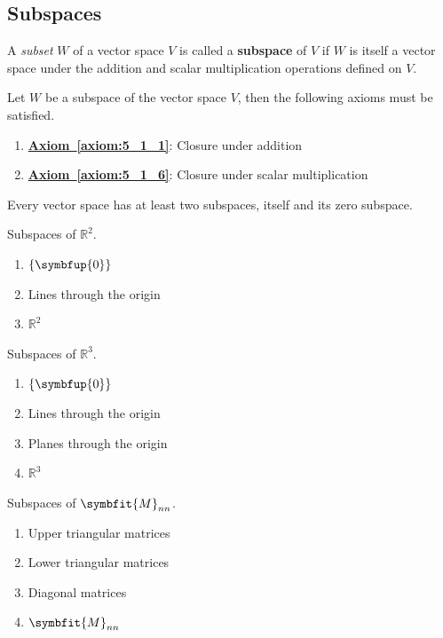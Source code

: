 \documentclass{article}
\begin{document}
\subsection{Subspaces}
\begin{definition}
    A \textit{subset} \(W\) of a vector space \(V\) is called a
    \textbf{subspace} of \(V\) if \(W\) is itself a vector space under
    the addition and scalar multiplication operations defined on \(V\).
\end{definition}
\begin{theorem}
    Let \(W\) be a subspace of the vector space \(V\), then the
    following axioms must be satisfied.
    \begin{enumerate}
        \item \textbf{\hyperref[axiom:5_1_1]{Axiom~\ref{axiom:5_1_1}}}:
              Closure under addition
        \item \textbf{\hyperref[axiom:5_1_6]{Axiom~\ref{axiom:5_1_6}}}:
              Closure under scalar multiplication
    \end{enumerate}
\end{theorem}
\begin{theorem}
    Every vector space has at least two subspaces, itself and its zero
    subspace.
\end{theorem}
\begin{theorem}
    Subspaces of \(\mathbb{R}^2\).
    \begin{enumerate}
        \item \(\left\{ \symbfup{0} \right\}\)
        \item Lines through the origin
        \item \(\mathbb{R}^2\)
    \end{enumerate}
\end{theorem}
\begin{theorem}
    Subspaces of \(\mathbb{R}^3\).
    \begin{enumerate}
        \item \(\left\{ \symbfup{0} \right\}\)
        \item Lines through the origin
        \item Planes through the origin
        \item \(\mathbb{R}^3\)
    \end{enumerate}
\end{theorem}
\begin{theorem}
    Subspaces of \(\symbfit{M}_{nn}\).
    \begin{enumerate}
        \item Upper triangular matrices
        \item Lower triangular matrices
        \item Diagonal matrices
        \item \(\symbfit{M}_{nn}\)
    \end{enumerate}
\end{theorem}
\end{document}
